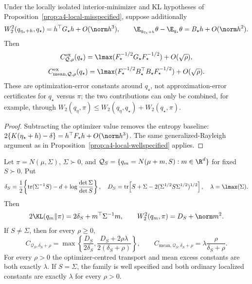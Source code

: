 \documentclass[../../main.tex]{subfiles}
\begin{document}
\begin{proposition}
\label{prop:a4-local-excess}
Under the locally isolated interior-minimizer and KL hypotheses of
Proposition~\ref{prop:a4-local-misspecified}, suppose additionally
\[
 W_2^2(q_{\eta_\star+h},q_\star)=h^\top G_\star h+O(\norm h^3),\qquad
 \E_{q_{\eta_\star+h}}\theta-\E_{q_\star}\theta=B_\star h+O(\norm h^2).
\]
Then
\[
 C^{\mathrm{ex}}_{\mathcal Q,\rho}(q_\star)
 =\lmax(F_\star^{-1/2}G_\star F_\star^{-1/2})+O(\sqrt\rho),
\]
\[
 C^{\mathrm{ex}}_{\mathrm{mean},\mathcal Q,\rho}(q_\star)
 =\lmax(F_\star^{-1/2}B_\star^\top B_\star F_\star^{-1/2})+O(\sqrt\rho).
\]
These are optimization-error constants around $q_\star$, not approximation-error certificates
for $q_\star$ versus $\pi$; the two contributions can only be combined, for example, through
$W_2(q_\eta,\pi)\le W_2(q_\eta,q_\star)+W_2(q_\star,\pi)$.
\end{proposition}

\begin{proof}
Subtracting the optimizer value removes the entropy baseline:
$2\{K(\eta_\star+h)-\delta\}=h^\top F_\star h+O(\norm h^3)$. The same generalized-Rayleigh
argument as in Proposition~\ref{prop:a4-local-wellspecified} applies.
\end{proof}

\begin{example}
\label{ex:a4-gaussian-local}
Let $\pi=N(\mu,\Sigma)$, $\Sigma\succ0$, and
$\mathcal Q_S=\{q_m=N(\mu+m,S):m\in\R^d\}$ for fixed $S\succ0$. Put
\[
 \delta_S=\frac12\!\left\{\operatorname{tr}(\Sigma^{-1}S)-d
       +\log\frac{\det\Sigma}{\det S}\right\},
\quad
 D_S=\operatorname{tr}\!\left[S+\Sigma
       -2(\Sigma^{1/2}S\Sigma^{1/2})^{1/2}\right],
\quad \lambda=\lmax(\Sigma).
\]
Then
\[
 2\KL(q_m\|\pi)=2\delta_S+m^\top\Sigma^{-1}m,\qquad
 W_2^2(q_m,\pi)=D_S+\norm m^2.
\]
If $S\ne\Sigma$, then for every $\rho\ge0$,
\begin{equation}\label{eq:a4-gaussian-misspec}
 C_{\mathcal Q_S,\delta_S+\rho}
 =\max\!\left\{\frac{D_S}{2\delta_S},
 \frac{D_S+2\rho\lambda}{2(\delta_S+\rho)}\right\},
 \qquad
 C_{\mathrm{mean},\mathcal Q_S,\delta_S+\rho}
 =\lambda\frac{\rho}{\delta_S+\rho}.
\end{equation}
For every $\rho>0$ the optimizer-centred transport and mean excess constants are both exactly
$\lambda$. If $S=\Sigma$, the family is well specified and both ordinary localized constants
are exactly $\lambda$ for every $\rho>0$.
\end{example}
\end{document}
